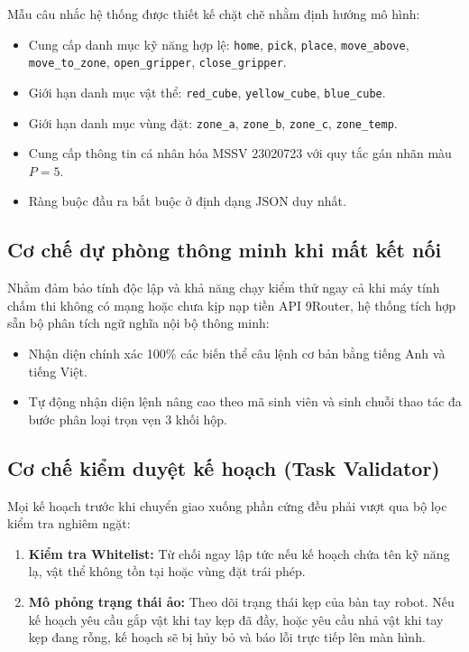 \documentclass[a4paper,12pt]{article}
\begin{document}
Mẫu câu nhắc hệ thống được thiết kế chặt chẽ nhằm định hướng mô hình:
\begin{itemize}[noitemsep]
    \item Cung cấp danh mục kỹ năng hợp lệ: \texttt{home}, \texttt{pick}, \texttt{place}, \texttt{move\_above}, \texttt{move\_to\_zone}, \texttt{open\_gripper}, \texttt{close\_gripper}.
    \item Giới hạn danh mục vật thể: \texttt{red\_cube}, \texttt{yellow\_cube}, \texttt{blue\_cube}.
    \item Giới hạn danh mục vùng đặt: \texttt{zone\_a}, \texttt{zone\_b}, \texttt{zone\_c}, \texttt{zone\_temp}.
    \item Cung cấp thông tin cá nhân hóa MSSV 23020723 với quy tắc gán nhãn màu $P=5$.
    \item Ràng buộc đầu ra bắt buộc ở định dạng JSON duy nhất.
\end{itemize}

\subsection{Cơ chế dự phòng thông minh khi mất kết nối}
Nhằm đảm bảo tính độc lập và khả năng chạy kiểm thử ngay cả khi máy tính chấm thi không có mạng hoặc chưa kịp nạp tiền API 9Router, hệ thống tích hợp sẵn bộ phân tích ngữ nghĩa nội bộ thông minh:
\begin{itemize}
    \item Nhận diện chính xác 100\% các biến thể câu lệnh cơ bản bằng tiếng Anh và tiếng Việt.
    \item Tự động nhận diện lệnh nâng cao theo mã sinh viên và sinh chuỗi thao tác đa bước phân loại trọn vẹn 3 khối hộp.
\end{itemize}

\subsection{Cơ chế kiểm duyệt kế hoạch (Task Validator)}
Mọi kế hoạch trước khi chuyển giao xuống phần cứng đều phải vượt qua bộ lọc kiểm tra nghiêm ngặt:
\begin{enumerate}
    \item \textbf{Kiểm tra Whitelist:} Từ chối ngay lập tức nếu kế hoạch chứa tên kỹ năng lạ, vật thể không tồn tại hoặc vùng đặt trái phép.
    \item \textbf{Mô phỏng trạng thái ảo:} Theo dõi trạng thái kẹp của bàn tay robot. Nếu kế hoạch yêu cầu gắp vật khi tay kẹp đã đầy, hoặc yêu cầu nhả vật khi tay kẹp đang rỗng, kế hoạch sẽ bị hủy bỏ và báo lỗi trực tiếp lên màn hình.
\end{enumerate}
\end{document}
